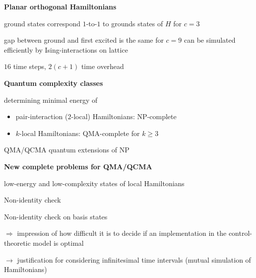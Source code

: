 \documentclass[portrait]{seminar}
\begin{document}
\begin{slide}
{\bf Planar orthogonal Hamiltonians}
\vfill
\hspace{0.25cm}
\textwidth{}
\hspace{0.5cm}

ground states correspond $1$-to-$1$ to grounds states of $H$ for $c=3$

gap between ground and first excited is the same for $c=9$
\vfill
can be simulated efficiently by Ising-interactions on lattice

$16$ time steps, $2(c+1)$ time overhead
\vfill
\end{slide}

\begin{slide}
{\bf Quantum complexity classes}
\medskip

determining minimal energy of 
\begin{itemize}
\item pair-interaction ($2$-local) Hamiltonians: NP-complete
\item $k$-local Hamiltonians: {\blue QMA}-complete for $k\ge 3$
\end{itemize}
\medskip

QMA/QCMA quantum extensions of NP
\vfill
\end{slide}

\begin{slide}
{\bf New complete problems for QMA/QCMA}
\medskip

{\red low-energy and low-complexity states of local Hamiltonians}
\vfill

{\red Non-identity check}

\medskip

{\red Non-identity check on basis states}
\medskip

$\Rightarrow$ impression of how difficult it is to decide if an 
implementation in the control-theoretic model is optimal
\medskip

$\rightarrow$ justification for considering infinitesimal time
intervals (mutual simulation of Hamiltonians) 
\vfill
\end{slide}
\end{document}
